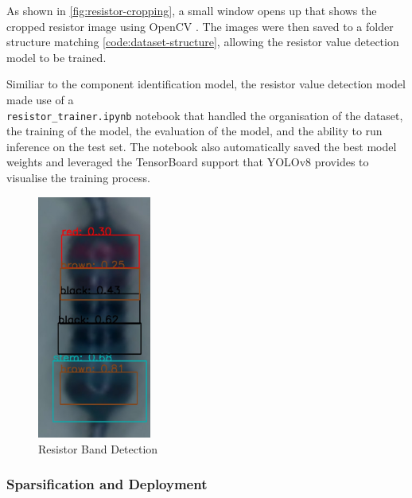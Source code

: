 As shown in \autoref{fig:resistor-cropping}, a small window opens up that shows the cropped resistor image using OpenCV \cite{home_2024}. The images were then saved to a folder structure matching \autoref{code:dataset-structure}, allowing the resistor value detection model to be trained.

Similiar to the component identification model, the resistor value detection model made use of a 
\\ \texttt{resistor\_trainer.ipynb} notebook that handled the organisation of the dataset, the training of the model, the evaluation of the model, and the ability to run inference on the test set. The notebook also automatically saved the best model weights and leveraged the TensorBoard support that YOLOv8 provides to visualise the training process.

\begin{figure}[H]
  \hfill
  \begin{minipage}[t]{\textwidth}
    \centering
    \includegraphics[height=8cm]{imgs/cv/banddetection.jpg}
    \caption{Resistor Band Detection}
    \label{fig:band-detection}
  \end{minipage}
\end{figure}

\subsubsection{Sparsification and Deployment}

